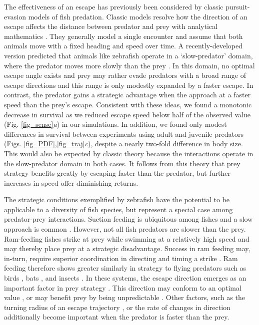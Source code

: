 \documentclass[]{rsos}%
\begin{document}
The effectiveness of an escape has previously been considered by classic pursuit-evasion models of fish predation.
Classic models resolve how the direction of an escape affects the distance between predator and prey with analytical mathematics \cite{Isaacs:1965uz,Weihs:1984tb}. 
They generally model a single encounter and assume that both animals move with a fixed heading and speed over time. 
A recently-developed version predicted that animals like zebrafish operate in a `slow-predator' domain, where the predator moves more slowly than the prey \cite{Soto:2015cj}.
In this domain, no optimal escape angle exists and prey may rather evade predators with a broad range of escape directions and this range is only modestly expanded by a faster escape. 
In contrast, the predator gains a strategic advantage when the approach at a faster speed than the prey's escape\cite{Weihs:1984tb}. 
Consistent with these ideas, we found a monotonic decrease in survival as we reduced escape speed below half of the observed value (Fig. \ref{fig_sense}\textit{a}) in our simulations. 
In addition, we found only modest differences in survival between experiments using adult and juvenile predators (Figs. \ref{fig_PDF},\ref{fig_traj}\textit{c}), despite a nearly two-fold difference in body size.
This would also be expected by classic theory because the interactions operate in the slow-predator domain in both cases.
It follows from this theory that prey strategy benefits greatly by escaping faster than the predator, but further increases in speed offer diminishing returns. 

The strategic conditions exemplified by zebrafish have the potential to be applicable to a diversity of fish species, but represent a special case among predator-prey interactions.
Suction feeding is ubiquitous among fishes and a slow approach is common \cite{Webb:1984jz,Higham:2007go}.
However, not all fish predators are slower than the prey.
Ram-feeding fishes strike at prey while swimming at a relatively high speed and may thereby place prey at a strategic disadvantage.
Success in ram feeding may, in-turn, require superior coordination in directing and timing a strike \cite{Wainwright:2001ufa}.
Ram feeding therefore shows greater similarly in strategy to flying predators such as birds \cite{Shifferman:2004fs}, bats \cite{Ghose:2006dk}, and insects \cite{Combes:2012et}.
In these systems, the escape direction emerges as an important factor in prey strategy \cite{Domenici:2011tv,Domenici:2011vl}.
This direction may conform to an optimal value \cite{Weihs:1984tb}, or may benefit prey by being unpredictable \cite{Humphries:1970hy}.
Other factors, such as the turning radius of an escape trajectory \cite{Howland:1974ud}, or the rate of changes in direction \cite{Humphries:1970hy} additionally become important when the predator is faster than the prey. 
\end{document}
